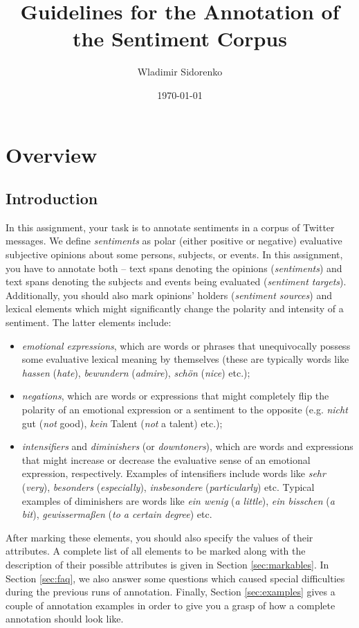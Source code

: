 \documentclass[11pt,a4paper]{article}
\author{Wladimir Sidorenko}
\date{\today}
\title{Guidelines for the Annotation of the Sentiment Corpus}
\theoremstyle{mytheoremstyle}
\begin{document}
\maketitle{}
\section{Overview}
\subsection{Introduction}

In this assignment, your task is to annotate sentiments in a corpus of
Twitter messages.  We define \emph{sentiments} as polar (either
positive or negative) evaluative subjective opinions about some
persons, subjects, or events.  In this assignment, you have to
annotate both -- text spans denoting the opinions (\emph{sentiments})
and text spans denoting the subjects and events being evaluated
(\emph{sentiment targets}).  Additionally, you should also mark
opinions' holders (\emph{sentiment sources}) and lexical elements
which might significantly change the polarity and intensity of a
sentiment.  The latter elements include:
\begin{itemize}
  \item \emph{emotional expressions}, which are words or phrases that
    unequivocally possess some evaluative lexical meaning by
    themselves (these are typically words like \emph{hassen}
    (\emph{hate}), \emph{bewundern} (\emph{admire}), \emph{sch\"on}
    (\emph{nice}) etc.);
  \item \emph{negations}, which are words or expressions that might
    completely flip the polarity of an emotional expression or a
    sentiment to the opposite (e.g. \emph{nicht} gut (\emph{not}
    good), \emph{kein} Talent (\emph{not} a talent) etc.);
  \item \emph{intensifiers} and \emph{diminishers} (or
    \emph{downtoners}), which are words and expressions that might
    increase or decrease the evaluative sense of an emotional
    expression, respectively.  Examples of intensifiers include words
    like \emph{sehr} (\emph{very}), \emph{besonders}
    (\emph{especially}), \emph{insbesondere} (\emph{particularly})
    etc.  Typical examples of diminishers are words like \emph{ein
      wenig} (\emph{a little}), \emph{ein bisschen} (\emph{a bit}),
    \emph{gewisserma\ss{}en} (\emph{to a certain degree}) etc.
\end{itemize}

After marking these elements, you should also specify the values of
their attributes.  A complete list of all elements to be marked along
with the description of their possible attributes is given in Section
\ref{sec:markables}.  In Section \ref{sec:faq}, we also answer some
questions which caused special difficulties during the previous runs
of annotation.  Finally, Section \ref{sec:examples} gives a couple of
annotation examples in order to give you a grasp of how a complete
annotation should look like.
\end{document}

